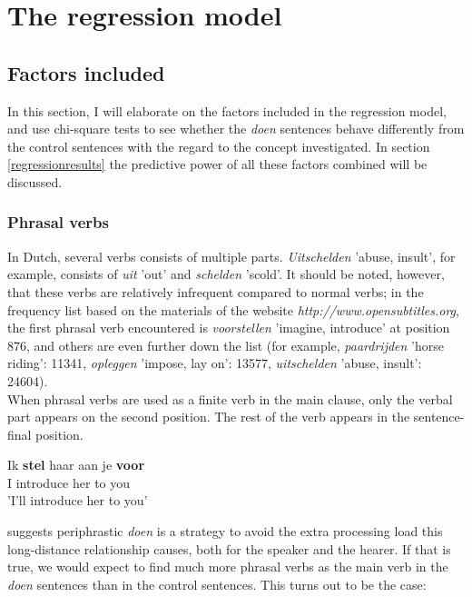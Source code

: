 \documentclass[12pt]{article}
\begin{document}

\section{The regression model} \label{regression}

\subsection{Factors included}

In this section, I will elaborate on the factors included in the regression model, and use chi-square tests to see whether the \emph{doen} sentences behave differently from the control sentences with the regard to the concept investigated. In section \ref{regressionresults} the predictive power of all these factors combined will be discussed.

\subsubsection{Phrasal verbs}
In Dutch, several verbs consists of multiple parts. \emph{Uitschelden} 'abuse, insult', for example, consists of \emph{uit} 'out' and \emph{schelden} 'scold'. It should be noted, however, that these verbs are relatively infrequent compared to normal verbs; in the frequency list based on the materials of the website \emph{http://www.opensubtitles.org}, the first phrasal verb encountered is \emph{voorstellen} 'imagine, introduce' at position 876, and others are even further down the list (for example, \emph{paardrijden} 'horse riding': 11341, \emph{opleggen} 'impose, lay on': 13577, \emph{uitschelden} 'abuse, insult': 24604).\\\indent
When phrasal verbs are used as a finite verb in the main clause, only the verbal part appears on the second position. The rest of the verb appears in the sentence-final position.

\begin{exe}
\ex \gll Ik \textbf{stel} haar aan je \textbf{voor}\\
I introduce her to you\\
'I'll introduce her to you'
\end{exe}

\citet[pp. 156]{n62} suggests periphrastic \emph{doen} is a strategy to avoid the extra processing load this long-distance relationship causes, both for the speaker and the hearer. If that is true, we would expect to find much more phrasal verbs as the main verb in the \emph{doen} sentences than in the control sentences. This turns out to be the case:
\end{document}
